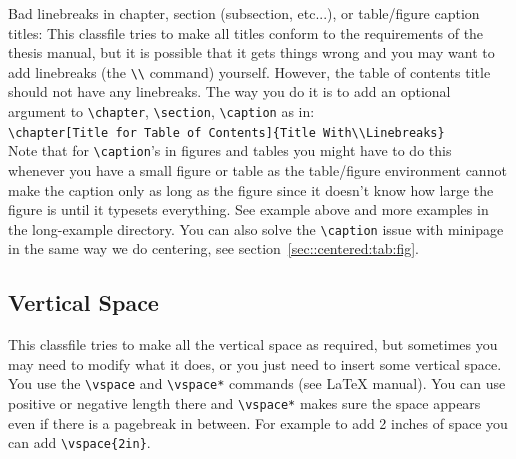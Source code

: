 Bad linebreaks in chapter, section (subsection, etc...), or
table/figure caption titles: This classfile tries to make all titles
conform to the requirements of the thesis manual, but it is possible
that it gets things wrong and you may want to add linebreaks (the
\verb+\\+ command) yourself.  However, the table of contents title
should not have any linebreaks.  The way you do it is to add an
optional argument to \verb+\chapter+, \verb+\section+,
\verb+\caption+ as in:\\[0.5\baselineskip]
\hspace*{2em}\verb+\chapter[Title for Table of Contents]{Title With\\Linebreaks}+\\[0.5\baselineskip]
Note that for \verb+\caption+'s in figures and tables you might have
to do this whenever you have a small figure or table as the
table/figure environment cannot make the caption only as long as the
figure since it doesn't know how large the figure is until it typesets
everything.  See example above and more examples in the long-example
directory.  You can also solve the \verb+\caption+ issue with minipage
in the same way we do centering, see
section~\ref{sec::centered:tab:fig}.



\subsection{Vertical Space}

This classfile tries to make all the vertical space as required, but
sometimes you may need to modify what it does, or you just need to
insert some vertical space.  You use the \verb+\vspace+ and
\verb+\vspace*+ commands (see \LaTeX{} manual).  You can use positive
or negative length there and \verb+\vspace*+ makes sure the space appears
even if there is a pagebreak in between.  For example to add 2 inches
of space you can add \verb+\vspace{2in}+.


